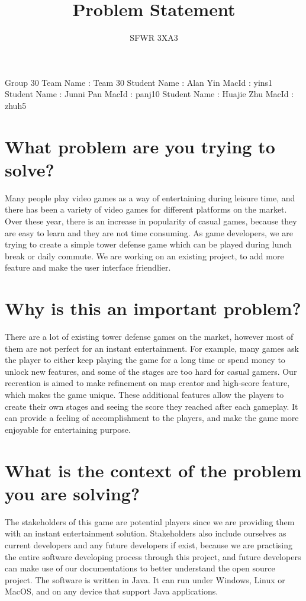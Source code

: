 \documentclass[12pt]{article}
\title{Problem Statement}
\author{SFWR 3XA3}
\begin{document}
   \maketitle
   \noindent
   Group 30
   \newline
   Team Name : Team 30
   \newline
   Student Name : Alan Yin    MacId : yins1
   \newline
   Student Name : Junni Pan    MacId : panj10
   \newline
   Student Name : Huajie Zhu    MacId : zhuh5
   \section *{What problem are you trying to solve?}
   Many people play video games as a way of entertaining during leisure time, and there has been a variety of video games for different platforms on the market. Over these year, there is an increase in popularity of casual games, because they are easy to learn and they are not time consuming. As game developers, we are trying to create a simple tower defense game which can be played during lunch break or daily commute. We are working on an existing project, to add more feature and make the user interface friendlier.
   \newline
   \section *{Why is this an important problem?}
   There are a lot of existing tower defense games on the market, however most of them are not perfect for an instant entertainment. For example, many games ask the player to either keep playing the game for a long time or spend money to unlock new features, and some of the stages are too hard for casual gamers. Our recreation is aimed to make refinement on map creator and high-score feature, which makes the game unique. These additional features allow the players to create their own stages and seeing the score they reached after each gameplay. It can provide a feeling of accomplishment to the players, and make the game more enjoyable for entertaining purpose. 
   \newline
   \section *{What is the context of the problem you are solving?}
   The stakeholders of this game are potential players since we are providing them with an instant entertainment solution. Stakeholders also include ourselves as current developers and any future developers if exist, because we are practising the entire software developing process through this project, and future developers can make use of our documentations to better understand the open source project. The software is written in Java. It can run under Windows, Linux or MacOS, and on any device that support Java applications. 
\end{document}
